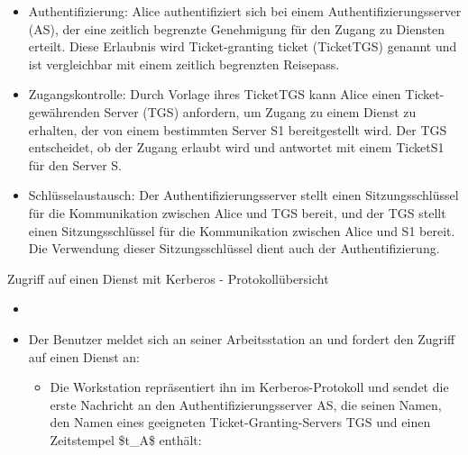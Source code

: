 \documentclass[a4paper]{article}
\begin{document}
\begin{multicols}{3}
\begin{itemize}
              \begin{itemize}
                  \item
                        Authentifizierung: Alice authentifiziert sich bei einem
                        Authentifizierungsserver (AS), der eine zeitlich begrenzte
                        Genehmigung für den Zugang zu Diensten erteilt. Diese Erlaubnis wird
                        Ticket-granting ticket (TicketTGS) genannt und ist vergleichbar mit
                        einem zeitlich begrenzten Reisepass.
                  \item
                        Zugangskontrolle: Durch Vorlage ihres TicketTGS kann Alice einen
                        Ticket-gewährenden Server (TGS) anfordern, um Zugang zu einem Dienst
                        zu erhalten, der von einem bestimmten Server S1 bereitgestellt wird.
                        Der TGS entscheidet, ob der Zugang erlaubt wird und antwortet mit
                        einem TicketS1 für den Server S.
                  \item
                        Schlüsselaustausch: Der Authentifizierungsserver stellt einen
                        Sitzungsschlüssel für die Kommunikation zwischen Alice und TGS
                        bereit, und der TGS stellt einen Sitzungsschlüssel für die
                        Kommunikation zwischen Alice und S1 bereit. Die Verwendung dieser
                        Sitzungsschlüssel dient auch der Authentifizierung.
              \end{itemize}
    \end{itemize}

    Zugriff auf einen Dienst mit Kerberos - Protokollübersicht

    \begin{itemize}
        \item
        \item
              Der Benutzer meldet sich an seiner Arbeitsstation an und fordert den
              Zugriff auf einen Dienst an:

              \begin{itemize}
                  \item
                        Die Workstation repräsentiert ihn im Kerberos-Protokoll und sendet
                        die erste Nachricht an den Authentifizierungsserver AS, die seinen
                        Namen, den Namen eines geeigneten Ticket-Granting-Servers TGS und
                        einen Zeitstempel \$t\_A\$ enthält:
              \end{itemize}


\end{itemize}
\end{multicols}
\end{document}
